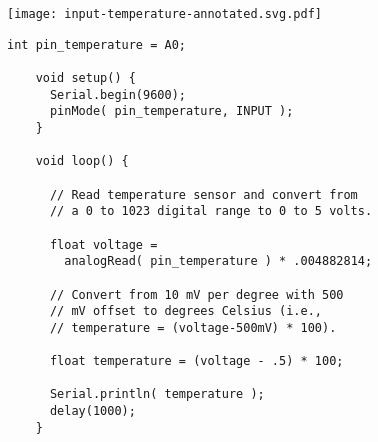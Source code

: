 \vspace{0.1in}
\begin{minipage}[t]{0.49\tw}
  \vspace{0.6in}

  \texttt{[image: input-temperature-annotated.svg.pdf]}
\end{minipage}
\hfill
\begin{minipage}[t]{0.49\tw}
  \vspace{0.1in}
  \begin{Verbatim}[gobble=3,fontsize=\small]
    int pin_temperature = A0;

    void setup() {
      Serial.begin(9600);
      pinMode( pin_temperature, INPUT );
    }

    void loop() {

      // Read temperature sensor and convert from
      // a 0 to 1023 digital range to 0 to 5 volts.

      float voltage =
        analogRead( pin_temperature ) * .004882814;

      // Convert from 10 mV per degree with 500
      // mV offset to degrees Celsius (i.e.,
      // temperature = (voltage-500mV) * 100).

      float temperature = (voltage - .5) * 100;

      Serial.println( temperature );
      delay(1000);
    }
  \end{Verbatim}
\end{minipage}
\vspace{0.1in}

